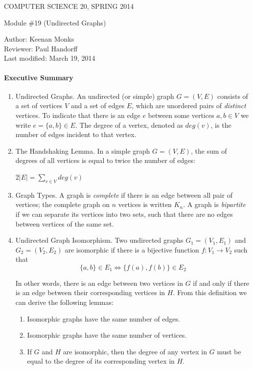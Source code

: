 \documentclass[12pt]{article}
\begin{document}
\begin{center}
COMPUTER SCIENCE 20, SPRING 2014 \\

\smallskip

Module \#19 (Undirected Graphs)
\end{center}
Author: Keenan Monks\\
Reviewer: Paul Handorff\\
Last modified: March 19, 2014

\medskip

\paragraph*{Executive Summary}
\begin{enumerate}

\item Undirected Graphs. An undirected (or simple) graph $G = (V,E)$ consists of a set of vertices $V$ and a set of edges $E$, which are unordered pairs of \textit{distinct} vertices. To indicate that there is an edge $e$ between some vertices $a,b \in V$ we write $e = \{a,b\}\in E$. The degree of a vertex, denoted as $deg(v)$, is the number of edges incident to that vertex.

\item The Handshaking Lemma. In a simple graph $G = (V,E)$, the sum of degrees of all vertices is equal to twice the number of edges:
\begin{center}
$2|E| = \sum\limits_{v \in V}  deg(v)$
\end{center}
\item Graph Types. A graph is \emph{complete} if there is an edge between all pair of vertices; the complete graph on $n$ vertices is written $K_n$. A graph is \emph{bipartite} if we can separate its vertices into two sets, such that there are no edges between vertices of the same set.

\item Undirected Graph Isomorphism. Two undirected graphs $G_1 = (V_1, E_1)$ and $G_2 = (V_2, E_2)$ are isomorphic if there is a bijective function $f: V_1 \rightarrow V_2$ such that
  $$\{a,b\} \in E_1 \Leftrightarrow \{f(a),f(b)\} \in E_2  $$

In other words, there is an edge between two vertices in $G$ if and only if there is an edge between their corresponding vertices in $H$. From this definition we can derive the following lemmas:
\begin{enumerate}
\item Isomorphic graphs have the same number of edges.
\item Isomorphic graphs have the same number of vertices.
\item If $G$ and $H$ are isomorphic, then the degree of any vertex in $G$ must be equal to the degree of its corresponding vertex in $H$.
\end{enumerate}
\end{enumerate}
\end{document}
